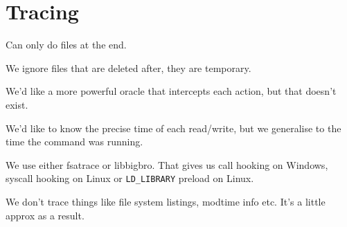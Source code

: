 \section{Tracing}
\label{sec:tracing}

Can only do files at the end.

We ignore files that are deleted after, they are temporary.

We'd like a more powerful oracle that intercepts each action, but that doesn't exist.

We'd like to know the precise time of each read/write, but we generalise to the time the command was running.

We use either fsatrace or libbigbro. That gives us call hooking on Windows, syscall hooking on Linux or \verb"LD_LIBRARY" preload on Linux.

We don't trace things like file system listings, modtime info etc. It's a little approx as a result.
